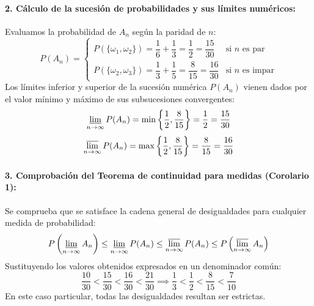 \begin{problema}
\paragraph{2. Cálculo de la sucesión de probabilidades y sus límites numéricos:}
Evaluamos la probabilidad de $A_n$ según la paridad de $n$:
\[
    P(A_n) = \begin{cases}
        P(\{\omega_1, \omega_2\}) = \dfrac{1}{6} + \dfrac{1}{3} = \dfrac{1}{2} = \dfrac{15}{30} & \text{si } n \text{ es par} \\[0.5em]
        P(\{\omega_2, \omega_3\}) = \dfrac{1}{3} + \dfrac{1}{5} = \dfrac{8}{15} = \dfrac{16}{30} & \text{si } n \text{ es impar}
    \end{cases}
\]
Los límites inferior y superior de la sucesión numérica $P(A_n)$ vienen dados por el valor mínimo y máximo de sus subsucesiones convergentes:
\[
    \varliminf_{n \to \infty} P(A_n) = \min\left\{\frac{1}{2}, \frac{8}{15}\right\} = \frac{1}{2} = \frac{15}{30}
\]
\[
    \varlimsup_{n \to \infty} P(A_n) = \max\left\{\frac{1}{2}, \frac{8}{15}\right\} = \frac{8}{15} = \frac{16}{30}
\]

\paragraph{3. Comprobación del Teorema de continuidad para medidas (Corolario 1):}
Se comprueba que se satisface la cadena general de desigualdades para cualquier medida de probabilidad:
\[
    P\left( \varliminf_{n \to \infty} A_n \right) \le \varliminf_{n \to \infty} P(A_n) \le \varlimsup_{n \to \infty} P(A_n) \le P\left( \varlimsup_{n \to \infty} A_n \right)
\]
Sustituyendo los valores obtenidos expresados en un denominador común:
\[
    \frac{10}{30} < \frac{15}{30} < \frac{16}{30} < \frac{21}{30} \implies \frac{1}{3} < \frac{1}{2} < \frac{8}{15} < \frac{7}{10}
\]
En este caso particular, todas las desigualdades resultan ser estrictas.
\end{problema}

\newpage

